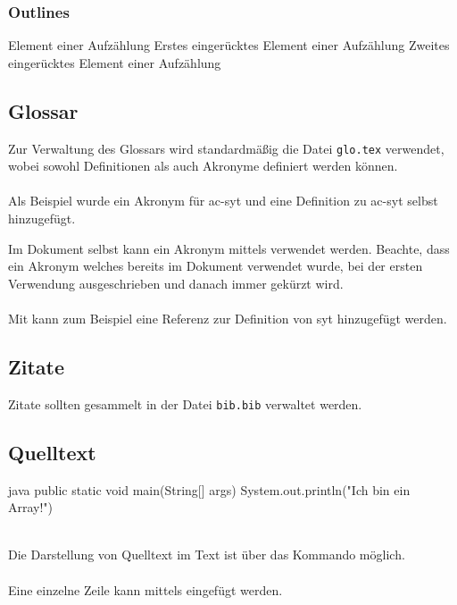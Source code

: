 \subsubsection{Outlines}
\begin{outline}
    \1 Element einer Aufzählung
        \2 Erstes eingerücktes Element einer Aufzählung
        \2 Zweites eingerücktes Element einer Aufzählung
\end{outline}

\subsection{Glossar}
Zur Verwaltung des Glossars wird standardmäßig die Datei \texttt{glo.tex} verwendet, wobei sowohl Definitionen als auch Akronyme definiert werden können.
\\\\
Als Beispiel wurde ein Akronym für \gls{ac-syt} und eine Definition zu \gls{ac-syt} selbst hinzugefügt.


Im Dokument selbst kann ein Akronym mittels  verwendet werden. Beachte, dass ein Akronym welches bereits im Dokument verwendet wurde, bei der ersten Verwendung ausgeschrieben und danach immer gekürzt wird.
\\\\
Mit  kann zum Beispiel eine Referenz zur Definition von \gls{syt} hinzugefügt werden.

\subsection{Zitate}
Zitate sollten gesammelt in der Datei \texttt{bib.bib} verwaltet werden.

\newpage
\subsection{Quelltext}
\begin{listing}[H]
\begin{code}[firstnumber=last]{java}
public static void main(String[] args) {
    System.out.println("Ich bin ein Array!")
}
\end{code}
\caption{Java Code}
\label{lst:java-code}
\end{listing}
~\\
Die Darstellung von Quelltext im Text ist über das Kommando  möglich.
\\\\
Eine einzelne Zeile kann mittels
eingefügt werden.

